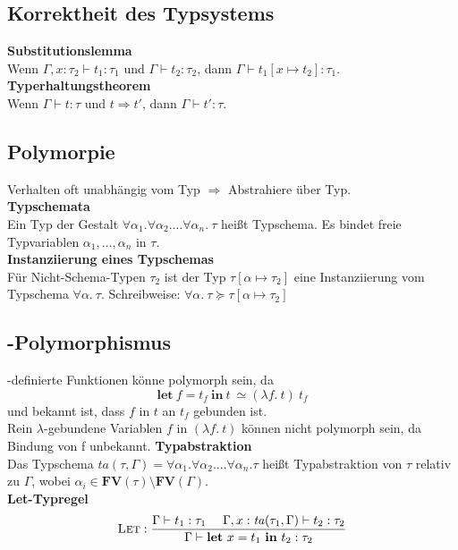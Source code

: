 \subsection{Korrektheit des Typsystems}%
\label{tg:sub:korrektheit-des-typsystems}
\textbf{Substitutionslemma}\\
Wenn \(\Gamma, x: \tau_2 \vdash t_1: \tau_1\) und \(\Gamma \vdash t_2: \tau_2\), dann \(\Gamma \vdash t_1[x \mapsto t_2]: \tau_1\).\\
\textbf{Typerhaltungstheorem}\\
Wenn \(\Gamma \vdash t: \tau\) und \(t \Rightarrow t'\), dann \(\Gamma \vdash t': \tau\).
\newpage
\subsection{Polymorpie}%
\label{tg:sub:polymorphie}
Verhalten oft unabhängig vom Typ \(\Rightarrow\) Abstrahiere über Typ.\\
\textbf{Typschemata}\\
Ein Typ der Gestalt \(\forall \alpha_1. \forall \alpha_2. \ldots \forall \alpha_n.\ \tau\) heißt Typschema.
Es bindet freie Typvariablen \(\alpha_1,\ldots,\alpha_n\) in \(\tau\).\\
\textbf{Instanziierung eines Typschemas}\\
Für Nicht-Schema-Typen \(\tau_2\) ist der Typ \(\tau[\alpha \mapsto \tau_2]\) eine Instanziierung vom
Typschema \(\forall \alpha.\ \tau\). Schreibweise: \(\forall \alpha.\ \tau \succeq \tau [\alpha \mapsto \tau_2]\)

\subsection{-Polymorphismus}%
\label{tg:sub:let-polymorphismus}
-definierte Funktionen könne polymorph sein, da
\[\mathbf{let}\ f = t_f\ \mathbf{in}\ t\ \simeq (\lambda f.\ t)\ t_f\]
und bekannt ist, dass \(f\) in \(t\) an \(t_f\) gebunden ist.\\
Rein \(\lambda\)-gebundene Variablen \(f\) in \((\lambda f.\ t)\) können nicht polymorph sein, da Bindung von f unbekannt.
\textbf{Typabstraktion}\\
Das Typschema \(\mathit{ta}(\tau, \Gamma) = \forall \alpha_1. \forall \alpha_2. \ldots \forall \alpha_n. \tau\) heißt Typabstraktion
von \(\tau\) relativ zu \(\Gamma\), wobei \(\alpha_i \in \mathbf{FV}(\tau) \setminus \mathbf{FV}(\Gamma)\).\\
\textbf{Let-Typregel}\\
\begin{align*}
  \textsc{Let}: \frac{\Gamma \vdash t_1: \tau_1\ \ \ \ \Gamma, x: \mathit{ta}(\tau_1, \Gamma) \vdash t_2: \tau_2}{\Gamma \vdash \mathbf{let}\ x = t_1\ \mathbf{in}\ t_2: \tau_2}
\end{align*}